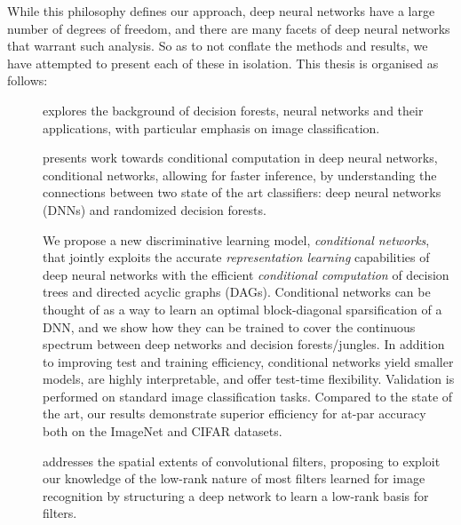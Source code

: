 \documentclass[thesis]{subfiles}
\begin{document}
While this philosophy defines our approach, deep neural networks have a large number of degrees of freedom, and there are many facets of deep neural networks that warrant such analysis. So as to not conflate the methods and results, we have attempted to present each of these in isolation. This thesis is organised as follows:
\begin{description}
	\item[] explores the background of decision forests, neural networks and their applications, with particular emphasis on image classification.
	
	\item[] presents work towards conditional computation in deep neural networks, conditional networks, allowing for faster inference, by understanding the connections between two state of the art classifiers: deep neural networks (DNNs) and randomized decision forests.
	
	We propose a new discriminative learning model, \emph{conditional networks}, 
	that jointly exploits the accurate \emph{representation learning} capabilities of deep neural networks with the efficient \emph{conditional computation} of decision trees and directed acyclic graphs (DAGs).
	Conditional networks can be thought of as a way to learn an optimal block-diagonal sparsification of a DNN, and we show how they can be trained to cover the continuous spectrum between deep networks and decision forests/jungles. 
	In addition to improving test and training efficiency, conditional networks yield smaller models, are highly interpretable, and offer test-time flexibility.
	Validation is performed on standard image classification tasks. Compared to the state of the art, our results demonstrate superior efficiency for at-par accuracy both on the ImageNet and CIFAR datasets.
	
	\item[] addresses the spatial extents of convolutional filters, proposing to exploit our knowledge of the low-rank nature of most filters learned for image recognition by structuring a deep network to learn a low-rank basis for filters.
	

\end{description}
\end{document}
